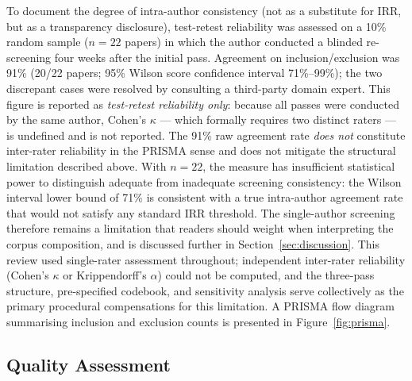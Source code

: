 To document the degree of intra-author consistency (not as a substitute for IRR,
but as a transparency disclosure), test-retest reliability was assessed on a
10\% random sample ($n = 22$ papers) in which the author conducted a blinded
re-screening four weeks after the initial pass.
Agreement on inclusion/exclusion was 91\% (20/22 papers; 95\% Wilson score
confidence interval 71\%--99\%); the two discrepant cases were resolved by
consulting a third-party domain expert.
This figure is reported as \emph{test-retest reliability only}: because all
passes were conducted by the same author, Cohen's $\kappa$ — which formally
requires two distinct raters — is undefined and is not reported.
The 91\% raw agreement rate \emph{does not} constitute inter-rater reliability
in the PRISMA sense and does not mitigate the structural limitation described
above.
With $n=22$, the measure has insufficient statistical power to distinguish
adequate from inadequate screening consistency: the Wilson interval lower bound
of 71\% is consistent with a true intra-author agreement rate that would not
satisfy any standard IRR threshold.
The single-author screening therefore remains a limitation that readers should
weight when interpreting the corpus composition, and is discussed further in
Section~\ref{sec:discussion}.
This review used single-rater assessment throughout; independent inter-rater reliability (Cohen's $\kappa$ or Krippendorff's $\alpha$) could not be computed, and the three-pass structure, pre-specified codebook, and sensitivity analysis serve collectively as the primary procedural compensations for this limitation.
A PRISMA flow diagram summarising inclusion and exclusion counts is presented
in Figure~\ref{fig:prisma}.



\subsection{Quality Assessment}

